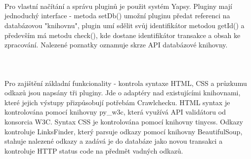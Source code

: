 \documentclass[10pt]{article}
\begin{document}
\paragraph{~}Pro vlastn\'i na\v{c}\'it\'an\'i a spr\'avu plugin\r{u} je pou\v{z}it syst\'em Yapsy. Pluginy maj\'i jednoduch\'y interface - metoda setDb() umo\v{z}n\'i pluginu p\v{r}edat referenci na datab\'azovou "knihovnu", plugin um\'i sd\v{e}lit sv\r{u}j identifik\'ator metodou getId() a p\v{r}edev\v{s}\'im m\'a metodu check(), kde dostane identifik\'ator transakce a obsah ke zpracov\'an\'i. Nalezen\'e poznatky oznamuje skrze API datab\'azov\'e knihovny.
\paragraph{~}Pro zaji\v{s}t\v{e}n\'i z\'akladn\'i funkcionality - kontrola syntaxe HTML, CSS a pr\r{u}zkumu odkaz\r{u} jsou naps\'any t\v{r}i pluginy. Jde o adapt\'ery nad existuj\'ic\'imi knihovnami, kter\'e jejich v\'ystupy p\v{r}izp\r{u}sobuj\'i pot\v{r}eb\'am Crawlchecku. HTML syntax je kontrolov\'ana pomoc\'i knihovny py\_w3c, kter\'a vyu\v{z}\'iv\'a API valid\'atoru od konsorcia W3C. Syntax CSS je kontrolov\'ana pomoc\'i knihovny tinycss. Odkazy kontroluje LinksFinder, kter\'y parsuje odkazy pomoc\'i knihovny BeautifulSoup, stahuje nalezen\'e odkazy a zad\'av\'a je do datab\'aze jako novou transakci a kontroluje HTTP status code na p\v{r}edm\v{e}t vadn\'ych odkaz\r{u}.
\end{document}
